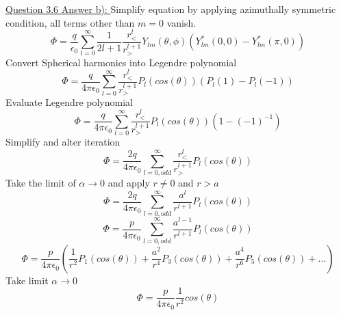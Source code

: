 \documentclass[12pt]{article}
\begin{document}
    \underline{Question 3.6 Answer b): }
    Simplify equation by applying azimuthally symmetric condition, all terms other than $m=0$ vanish.
    \begin{equation} \label{eq: 3.6-20}
        \Phi = \frac{q}{\epsilon_0} \sum_{l=0}^\infty  \frac{1}{2l+1} \frac{r_<^l}{r_>^{l+1}} Y_{lm}(\theta, \phi) \left( Y_{lm}^*(0, 0) - Y_{lm}^*(\pi, 0) \right)
    \end{equation}
    Convert Spherical harmonics into Legendre polynomial
    \begin{equation} \label{eq: 3.6-21}
        \Phi = \frac{q}{4 \pi \epsilon_0} \sum_{l=0}^\infty   \frac{r_<^l}{r_>^{l+1}} P_{l}(cos(\theta)) \left(P_{l}(1) - P_{l}(-1) \right)
    \end{equation}
    Evaluate Legendre polynomial
    \begin{equation} \label{eq: 3.6-22}
        \Phi = \frac{q}{4 \pi \epsilon_0} \sum_{l=0}^\infty   \frac{r_<^l}{r_>^{l+1}} P_{l}(cos(\theta)) \left(1-{(-1)}^{-1} \right)
    \end{equation}
    Simplify and alter iteration
    \begin{equation} \label{eq: 3.6-23}
        \Phi = \frac{2q}{4 \pi \epsilon_0} \sum_{l=0, odd}^\infty   \frac{r_<^l}{r_>^{l+1}} P_{l}(cos(\theta)) 
    \end{equation}
    Take the limit of $\alpha \rightarrow{} 0$ and apply $r \neq 0$ and $r>a$
    \begin{equation} \label{eq: 3.6-24}
        \Phi = \frac{2q}{4 \pi \epsilon_0} \sum_{l=0, odd}^\infty   \frac{a^l}{r^{l+1}} P_{l}(cos(\theta)) 
    \end{equation}
    \begin{equation} \label{eq: 3.6-25}
        \Phi = \frac{p}{4 \pi \epsilon_0} \sum_{l=0, odd}^\infty   \frac{a^{l-1}}{r^{l+1}} P_{l}(cos(\theta)) 
    \end{equation}
    \begin{equation} \label{eq: 3.6-26}
        \Phi = \frac{p}{4 \pi \epsilon_0} \left(\frac{1}{r^2} P_1(cos(\theta)) + \frac{a^2}{r^4} P_3(cos(\theta)) + \frac{a^4}{r^6} P_5(cos(\theta)) +... \right) 
    \end{equation}
    Take limit $\alpha \rightarrow{} 0$
    \begin{equation} \label{eq: 3.6-27}
        \Phi = \frac{p}{4 \pi \epsilon_0} \frac{1}{r^2} cos(\theta)
    \end{equation}
    
\end{document}

